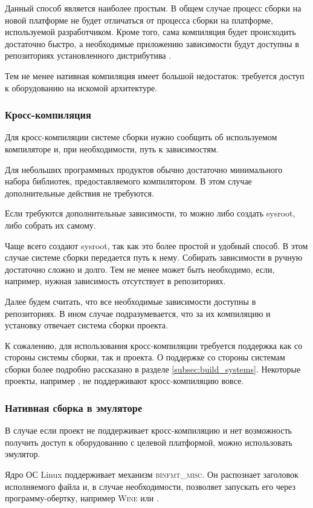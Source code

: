 Данный способ является наиболее простым.
В общем случае процесс сборки на новой платформе не будет отличаться от процесса сборки на платформе, используемой разработчиком.
Кроме того, сама компиляция будет происходить достаточно быстро, а необходимые приложению зависимости будут доступны в репозиториях установленного дистрибутива \linux{}.

Тем не менее нативная компиляция имеет большой недостаток: требуется доступ к оборудованию на искомой архитектуре.

\subsubsection{Кросс-компиляция}

Для кросс-компиляции системе сборки нужно сообщить об используемом компиляторе и, при необходимости, путь к зависимостям.

Для небольших программных продуктов обычно достаточно минимального набора библиотек, предоставляемого компилятором.
В этом случае дополнительные действия не требуются.

Если требуются дополнительные зависимости, то можно либо создать sysroot, либо собрать их самому.

Чаще всего создают sysroot, так как это более простой и удобный способ.
В этом случае системе сборки передается путь к нему.
Собирать зависимости в ручную достаточно сложно и долго.
Тем не менее может быть необходимо, если, например, нужная зависимость отсутствует в репозиториях.

Далее будем считать, что все необходимые зависимости доступны в репозиториях.
В ином случае подразумевается, что за их компиляцию и установку отвечает система сборки проекта.

К сожалению, для использования кросс-компиляции требуется поддержка как со стороны системы сборки, так и проекта.
О поддержке со стороны системам сборки более подробно рассказано в разделе \ref{subsec:build_systems}.
Некоторые проекты, например \OCaml{}, не поддерживают кросс-компиляцию вовсе.

\subsubsection{Нативная сборка в эмуляторе}

В случае если проект не поддерживает кросс-компиляцию и нет возможность получить доступ к оборудованию с целевой платформой, можно использовать эмулятор.

Ядро ОС Linux поддерживает механизм \textsc{binfmt\_misc}.
Он распознает заголовок исполняемого файла и, в случае необходимости, позволяет запускать его через программу-обертку, например \textsc{Wine} или \qemu{}.

